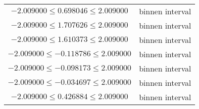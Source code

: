 \documentclass{article}
\begin{document}
\begin{longtabu}{cc}
    $-2.009000 \leq 0.698046 \leq 2.009000$ & binnen interval \\
    $-2.009000 \leq 1.707626 \leq 2.009000$ & binnen interval \\
    $-2.009000 \leq 1.610373 \leq 2.009000$ & binnen interval \\
    $-2.009000 \leq -0.118786 \leq 2.009000$ & binnen interval \\
    $-2.009000 \leq -0.098173 \leq 2.009000$ & binnen interval \\
    $-2.009000 \leq -0.034697 \leq 2.009000$ & binnen interval \\
    $-2.009000 \leq 0.426884 \leq 2.009000$ & binnen interval
\end{longtabu}
\end{document}
